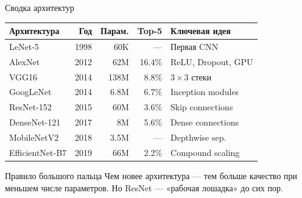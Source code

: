 \documentclass[aspectratio=169, 9pt]{beamer}
\begin{document}
\begin{frame}{Сводка архитектур}
  \centering
  \small
  \begin{tabular}{lrrrl}
    \toprule
    \textbf{Архитектура} & \textbf{Год} & \textbf{Парам.} & \textbf{Top-5} & \textbf{Ключевая идея} \\
    \midrule
    LeNet-5 & 1998 & 60K & — & Первая CNN \\
    AlexNet & 2012 & 62M & 16.4\% & ReLU, Dropout, GPU \\
    VGG16 & 2014 & 138M & 8.8\% & $3\times3$ стеки \\
    GoogLeNet & 2014 & 6.8M & 6.7\% & Inception modules \\
    ResNet-152 & 2015 & 60M & 3.6\% & Skip connections \\
    DenseNet-121 & 2017 & 8M & 5.6\% & Dense connections \\
    MobileNetV2 & 2018 & 3.5M & — & Depthwise sep. \\
    EfficientNet-B7 & 2019 & 66M & 2.2\% & Compound scaling \\
    \bottomrule
  \end{tabular}
  
  \vspace{1em}
  \begin{block}{Правило большого пальца}
    Чем новее архитектура — тем больше качество при меньшем числе параметров. Но ResNet — «рабочая лошадка» до сих пор.
  \end{block}
\end{frame}
\end{document}
